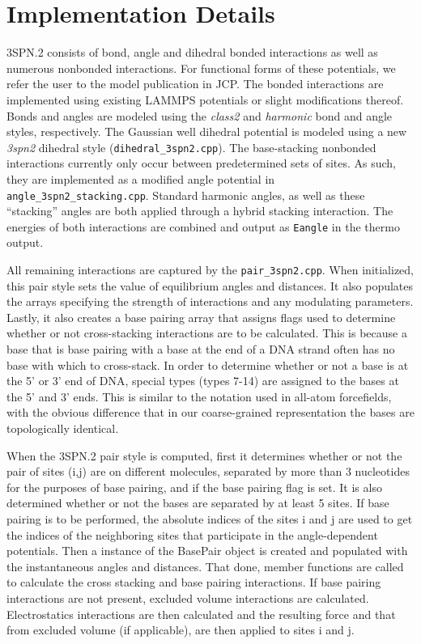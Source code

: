 \documentclass[11pt]{amsart}
\begin{document}
\section{Implementation Details}

3SPN.2 consists of bond, angle and dihedral bonded interactions as well as
numerous nonbonded interactions. For functional forms of these potentials, we
refer the user to the model publication in JCP.  The bonded interactions are
implemented using existing LAMMPS potentials or slight modifications thereof.
Bonds and angles are modeled using the \emph{class2} and \emph{harmonic} bond
and angle styles, respectively.  The Gaussian well dihedral potential is
modeled using a new \emph{3spn2} dihedral style 
(\texttt{dihedral\_3spn2.cpp}).  The
base-stacking nonbonded interactions currently only occur between predetermined sets of sites.
As such, they are implemented as a modified angle potential in
\texttt{angle\_3spn2\_stacking.cpp}.  Standard harmonic angles, as well as these
``stacking'' angles are both applied through a hybrid stacking interaction.
The energies of both interactions are combined and output as \texttt{Eangle} in
the thermo output.

All remaining interactions are captured by the \texttt{pair\_3spn2.cpp}.  When
initialized, this pair style sets the value of equilibrium angles and
distances.  It also populates the arrays specifying the strength of
interactions and any modulating parameters.  Lastly, it also creates a base
pairing array that assigns flags used to determine whether or not
cross-stacking interactions are to be calculated.  This is because a  base that
is base pairing with a base at the end of a DNA strand often has no base with
which to cross-stack.  In order to determine whether or not a base is at the 5'
or 3' end of DNA, special types (types 7-14) are assigned to the bases at the
5' and 3' ends.  This is similar to the notation used in all-atom forcefields,
with the obvious difference that in our coarse-grained representation the bases
are topologically identical.

When the 3SPN.2 pair style is computed, first it determines whether or not the
pair of sites (i,j) are on different molecules, separated by more than 3
nucleotides for the purposes of base pairing, and if the base pairing flag is
set.  It is also determined whether or not the bases are separated by at least
5 sites.  If base pairing is to be performed, the absolute indices of the sites
i and j are used to get the indices of the neighboring sites that participate
in the angle-dependent potentials.  Then a instance of the BasePair object is
created and populated with the instantaneous angles and distances.  That done,
member functions are called to calculate the cross stacking and base pairing
interactions.  If base pairing interactions are not present, excluded volume
interactions are calculated.   Electrostatics interactions are then calculated
and the resulting force and that from excluded volume (if applicable), are then
applied to sites i and j.
\end{document}
